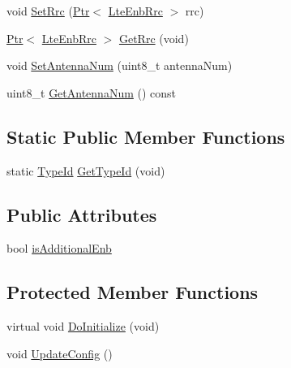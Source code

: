 \begin{DoxyCompactItemize}
void \hyperlink{classns3_1_1MmWaveEnbNetDevice_ad3701d04df5c60868519051f0c06958a}{Set\+Rrc} (\hyperlink{classns3_1_1Ptr}{Ptr}$<$ \hyperlink{classns3_1_1LteEnbRrc}{Lte\+Enb\+Rrc} $>$ rrc)
\item 
\hyperlink{classns3_1_1Ptr}{Ptr}$<$ \hyperlink{classns3_1_1LteEnbRrc}{Lte\+Enb\+Rrc} $>$ \hyperlink{classns3_1_1MmWaveEnbNetDevice_a57c6d1cd56f18056b98d00536dfef056}{Get\+Rrc} (void)
\item 
void \hyperlink{classns3_1_1MmWaveEnbNetDevice_a11ccb28facd60cc0729067d140a50bf2}{Set\+Antenna\+Num} (uint8\+\_\+t antenna\+Num)
\item 
uint8\+\_\+t \hyperlink{classns3_1_1MmWaveEnbNetDevice_a379e0d23cf36b4e55ec8d4036a2bbd80}{Get\+Antenna\+Num} () const 
\end{DoxyCompactItemize}
\subsection*{Static Public Member Functions}
\begin{DoxyCompactItemize}
\item 
static \hyperlink{classns3_1_1TypeId}{Type\+Id} \hyperlink{classns3_1_1MmWaveEnbNetDevice_a0da5e3bfec484b72c0f05c5089854e13}{Get\+Type\+Id} (void)
\end{DoxyCompactItemize}
\subsection*{Public Attributes}
\begin{DoxyCompactItemize}
\item 
bool \hyperlink{classns3_1_1MmWaveEnbNetDevice_aa7301abb2c597514155452b28ac66263}{is\+Additional\+Enb}
\end{DoxyCompactItemize}
\subsection*{Protected Member Functions}
\begin{DoxyCompactItemize}
\item 
virtual void \hyperlink{classns3_1_1MmWaveEnbNetDevice_aeaa257b7d6c6c28d832e002ce2d5e30d}{Do\+Initialize} (void)
\item 
void \hyperlink{classns3_1_1MmWaveEnbNetDevice_a903d7685bc738d357adfd08a034a900f}{Update\+Config} ()
\end{DoxyCompactItemize}

